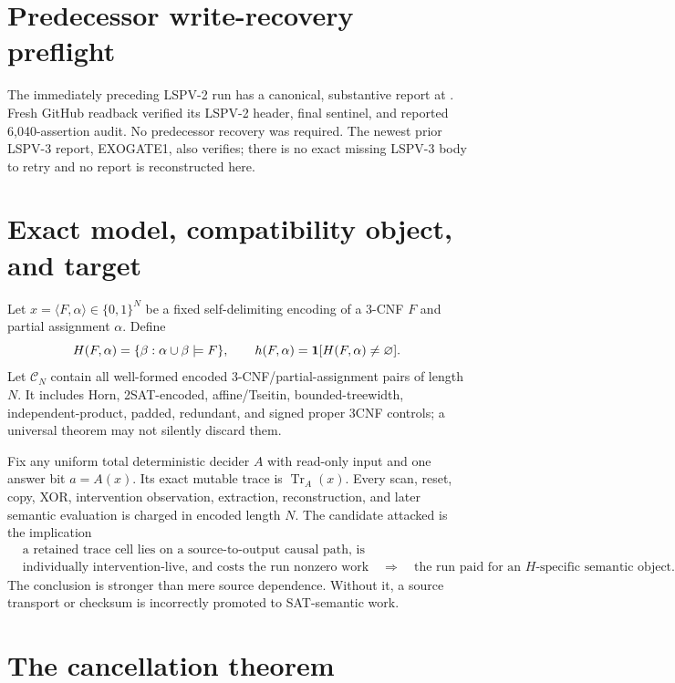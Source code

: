 \documentclass[11pt]{article}
\begin{document}
\section{Predecessor write-recovery preflight}
The immediately preceding LSPV-2 run has a canonical, substantive report at
.
Fresh GitHub readback verified its LSPV-2 header, final sentinel, and reported
6,040-assertion audit.  No predecessor recovery was required.  The newest
prior LSPV-3 report, EXOGATE1, also verifies; there is no exact missing LSPV-3
body to retry and no report is reconstructed here.

\section{Exact model, compatibility object, and target}
Let $x=\langle F,\alpha\rangle\in\{0,1\}^N$ be a fixed self-delimiting
encoding of a 3-CNF $F$ and partial assignment $\alpha$.  Define
\[
 H(F,\alpha)=\{\beta:\alpha\cup\beta\models F\},\qquad
 h(F,\alpha)={\bf 1}[H(F,\alpha)\ne\varnothing].
\]
Let $\mathcal C_N$ contain all well-formed encoded 3-CNF/partial-assignment
pairs of length $N$.  It includes Horn, 2SAT-encoded, affine/Tseitin,
bounded-treewidth, independent-product, padded, redundant, and signed proper
3CNF controls; a universal theorem may not silently discard them.

Fix any uniform total deterministic decider $A$ with read-only input and one
answer bit $a=A(x)$.  Its exact mutable trace is
$\operatorname{Tr}_A(x)$.  Every scan, reset, copy, XOR, intervention
observation, extraction, reconstruction, and later semantic evaluation is
charged in encoded length $N$.  The candidate attacked is the implication
\[
 \begin{split}
 &\text{a retained trace cell lies on a source-to-output causal path, is}\\
 &\text{individually intervention-live, and costs the run nonzero work}
 \quad\Longrightarrow\quad
 \text{the run paid for an $H$-specific semantic object.}
 \end{split}
\]
The conclusion is stronger than mere source dependence.  Without it, a
source transport or checksum is incorrectly promoted to SAT-semantic work.

\section{The cancellation theorem}
\end{document}
